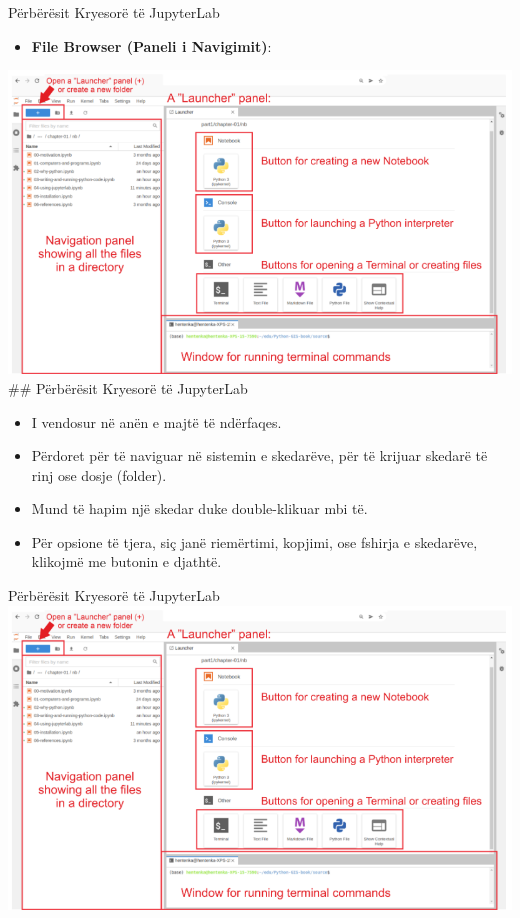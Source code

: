 \documentclass[
  ignorenonframetext,
]{beamer}
\providecommand{\tightlist}{%
  \setlength{\itemsep}{0pt}\setlength{\parskip}{0pt}}
\begin{document}
\begin{frame}{Përbërësit Kryesorë të JupyterLab}
\protect\hypertarget{puxebrbuxebruxebsit-kryesoruxeb-tuxeb-jupyterlab}{}
\begin{itemize}
\tightlist
\item
  \textbf{File Browser (Paneli i Navigimit)}:
\end{itemize}

\includegraphics{./Figs/jupyter1.png} \#\# Përbërësit Kryesorë të
JupyterLab

\begin{itemize}
\item
  I vendosur në anën e majtë të ndërfaqes.
\item
  Përdoret për të naviguar në sistemin e skedarëve, për të krijuar
  skedarë të rinj ose dosje (folder).
\item
  Mund të hapim një skedar duke double-klikuar mbi të.
\item
  Për opsione të tjera, siç janë riemërtimi, kopjimi, ose fshirja e
  skedarëve, klikojmë me butonin e djathtë.
\end{itemize}
\end{frame}

\begin{frame}{Përbërësit Kryesorë të JupyterLab}
\protect\hypertarget{puxebrbuxebruxebsit-kryesoruxeb-tuxeb-jupyterlab-1}{}
\includegraphics{./Figs/jupyter1.png}
\end{frame}
\end{document}
